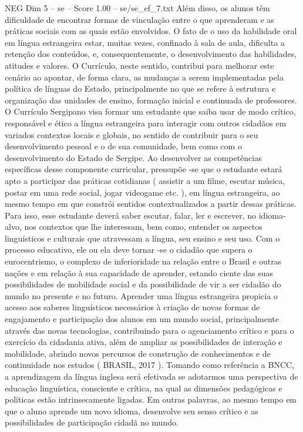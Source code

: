 \begin{textsample}{NEG Dim 5 – se – Score 1.00 – se/se\_ef\_7.txt}
Além disso, os alunos têm dificuldade de encontrar formas de vinculação entre o que aprenderam e as práticas sociais com as quais estão envolvidos.
O fato de o uso da habilidade oral em língua estrangeira estar, muitas vezes, confinado à sala de aula, dificulta a retenção dos conteúdos, e, consequentemente, o desenvolvimento das habilidades, atitudes e valores.
O Currículo, neste sentido, contribui para melhorar este cenário ao apontar, de forma clara, as mudanças a serem implementadas pela política de línguas do Estado, principalmente no que se refere à estrutura e organização das unidades de ensino, formação inicial e continuada de professores.
O Currículo Sergipano visa formar um estudante que saiba usar de modo crítico, responsável e ético a língua estrangeira para interagir com outros cidadãos em variados contextos locais e globais, no sentido de contribuir para o seu desenvolvimento pessoal e o de sua comunidade, bem como com o desenvolvimento do Estado de Sergipe.
Ao desenvolver as competências específicas desse componente curricular, pressupõe -se que o estudante estará apto a participar das práticas cotidianas ( assistir a um filme, escutar música, postar em uma rede social, jogar videogame etc. ), em língua estrangeira, ao mesmo tempo em que constrói sentidos contextualizados a partir dessas práticas.
Para isso, esse estudante deverá saber escutar, falar, ler e escrever, no idioma-alvo, nos contextos que lhe interessam, bem como, entender os aspectos linguísticos e culturais que atravessam a língua, seu ensino e seu uso.
Com o processo educativo, ele ou ela deve tornar -se o cidadão que supera o eurocentrismo, o complexo de inferioridade na relação entre o Brasil e outras nações e em relação à sua capacidade de aprender, estando ciente das suas possibilidades de mobilidade social e da possibilidade de vir a ser cidadão do mundo no presente e no futuro.
Aprender uma língua estrangeira propicia o acesso aos saberes linguísticos necessários à criação de novas formas de engajamento e participação dos alunos em um mundo social, principalmente através das novas tecnologias, contribuindo para o agenciamento crítico e para o exercício da cidadania ativa, além de ampliar as possibilidades de interação e mobilidade, abrindo novos percursos de construção de conhecimentos e de continuidade nos estudos ( BRASIL, 2017 ).
Tomando como referência a BNCC, a aprendizagem da língua inglesa será efetivada se adotarmos uma perspectiva de educação linguística, consciente e crítica, na qual as dimensões pedagógicas e políticas estão intrinsecamente ligadas.
Em outras palavras, ao mesmo tempo em que o aluno aprende um novo idioma, desenvolve seu senso crítico e as possibilidades de participação cidadã no mundo.

\end{textsample}
